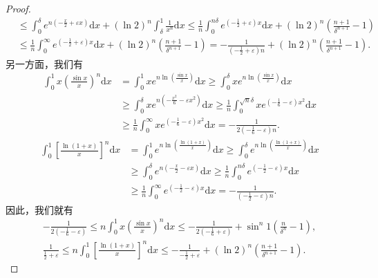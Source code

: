 \documentclass[../../main.tex]{subfiles}%
\begin{document}
\begin{proof}
\begin{align*}
&\leqslant \int_0^{\delta}{e^{n\left( -\frac{x}{2}+\varepsilon x \right)}\mathrm{d}x}+\left( \ln 2 \right) ^n\int_{\delta}^1{\frac{1}{x^n}\mathrm{d}x}\leqslant \frac{1}{n}\int_0^{n\delta}{e^{\left( -\frac{1}{2}+\varepsilon \right) x}\mathrm{d}x}+\left( \ln 2 \right) ^n\left( \frac{n+1}{\delta ^{n+1}}-1 \right)\\
&\leqslant \frac{1}{n}\int_0^{\infty}{e^{\left( -\frac{1}{2}+\varepsilon \right) x}\mathrm{d}x}+\left( \ln 2 \right) ^n\left( \frac{n+1}{\delta ^{n+1}}-1 \right) =-\frac{1}{\left( -\frac{1}{2}+\varepsilon \right) n}+\left( \ln 2 \right) ^n\left( \frac{n+1}{\delta ^{n+1}}-1 \right) .
\end{align*}
另一方面，我们有
\begin{align*}
\int_0^1{x\left( \frac{\sin x}{x} \right) ^n\mathrm{d}x}&=\int_0^1{xe^{n\ln \left( \frac{\sin x}{x} \right)}\mathrm{d}x}\geqslant \int_0^{\delta}{xe^{n\ln \left( \frac{\sin x}{x} \right)}\mathrm{d}x}\\
&\geqslant \int_0^{\delta}{xe^{n\left( -\frac{x^2}{6}-\varepsilon x^2 \right)}\mathrm{d}x}\geqslant \frac{1}{n}\int_0^{\sqrt{n}\delta}{xe^{\left( -\frac{1}{6}-\varepsilon \right) x^2}\mathrm{d}x}\\
&\geqslant \frac{1}{n}\int_0^{\infty}{xe^{\left( -\frac{1}{6}-\varepsilon \right) x^2}\mathrm{d}x}=-\frac{1}{2\left( -\frac{1}{6}-\varepsilon \right) n}.
\end{align*}
\begin{align*}
\int_0^1{\left[ \frac{\ln \left( 1+x \right)}{x} \right] ^n\mathrm{d}x}&=\int_0^1{e^{n\ln \left( \frac{\ln \left( 1+x \right)}{x} \right)}\mathrm{d}x}\geqslant \int_0^{\delta}{e^{n\ln \left( \frac{\ln \left( 1+x \right)}{x} \right)}\mathrm{d}x}\\
&\geqslant \int_0^{\delta}{e^{n\left( -\frac{x}{2}-\varepsilon x \right)}\mathrm{d}x}\geqslant \frac{1}{n}\int_0^{n\delta}{e^{\left( -\frac{1}{2}-\varepsilon \right) x}\mathrm{d}x}\\
&\geqslant \frac{1}{n}\int_0^{\infty}{e^{\left( -\frac{1}{2}-\varepsilon \right) x}\mathrm{d}x}=-\frac{1}{\left( -\frac{1}{2}-\varepsilon \right) n}.
\end{align*}
因此，我们就有
\begin{gather*}
-\frac{1}{2\left( -\frac{1}{6}-\varepsilon \right)}\leqslant n\int_0^1{x\left( \frac{\sin x}{x} \right) ^n\mathrm{d}x}\leqslant -\frac{1}{2\left( -\frac{1}{6}+\varepsilon \right)}+\sin ^n1\left( \frac{n}{\delta ^n}-1 \right) ,\\
\frac{1}{\frac{1}{2}+\varepsilon}\leqslant n\int_0^1{\left[ \frac{\ln \left( 1+x \right)}{x} \right] ^n\mathrm{d}x}\leqslant -\frac{1}{-\frac{1}{2}+\varepsilon}+\left( \ln 2 \right) ^n\left( \frac{n+1}{\delta ^{n+1}}-1 \right) .

\end{gather*}
\end{proof}
\end{document}
